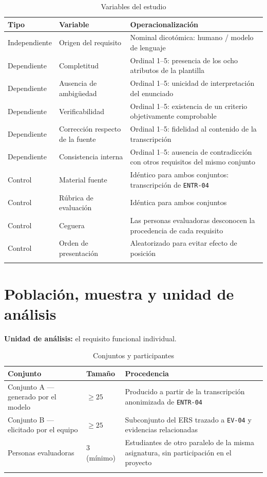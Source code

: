 \documentclass[11pt,a4paper]{article}
\newcommand{\id}[1]{\texttt{#1}}
\begin{document}
\begin{longtable}{|C{2.6cm}|L{5.4cm}|L{6.8cm}|}
\hline
{}\textbf{Tipo} & \textbf{Variable} & \textbf{Operacionalización} \\
\hline
\endhead
Independiente & Origen del requisito & Nominal dicotómica: humano / modelo de lenguaje \\ \hline
Dependiente & Completitud & Ordinal 1--5: presencia de los ocho atributos de la plantilla \\ \hline
Dependiente & Ausencia de ambigüedad & Ordinal 1--5: unicidad de interpretación del enunciado \\ \hline
Dependiente & Verificabilidad & Ordinal 1--5: existencia de un criterio objetivamente comprobable \\ \hline
Dependiente & Corrección respecto de la fuente & Ordinal 1--5: fidelidad al contenido de la transcripción \\ \hline
Dependiente & Consistencia interna & Ordinal 1--5: ausencia de contradicción con otros requisitos del mismo conjunto \\ \hline
Control & Material fuente & Idéntico para ambos conjuntos: transcripción de \id{ENTR-04} \\ \hline
Control & Rúbrica de evaluación & Idéntica para ambos conjuntos \\ \hline
Control & Ceguera & Las personas evaluadoras desconocen la procedencia de cada requisito \\ \hline
Control & Orden de presentación & Aleatorizado para evitar efecto de posición \\ \hline
\caption{Variables del estudio}
\end{longtable}

\section{Población, muestra y unidad de análisis}

\textbf{Unidad de análisis:} el requisito funcional individual.

\begin{longtable}{|L{5.6cm}|C{2.6cm}|L{6.0cm}|}
\hline
{}\textbf{Conjunto} & \textbf{Tamaño} & \textbf{Procedencia} \\
\hline
\endhead
Conjunto A --- generado por el modelo & $\geq 25$ & Producido a partir de la transcripción anonimizada de \id{ENTR-04} \\ \hline
Conjunto B --- elicitado por el equipo & $\geq 25$ & Subconjunto del ERS trazado a \id{EV-04} y evidencias relacionadas \\ \hline
Personas evaluadoras & 3 (mínimo) & Estudiantes de otro paralelo de la misma asignatura, sin participación en el proyecto \\ \hline
\caption{Conjuntos y participantes}
\end{longtable}
\end{document}
